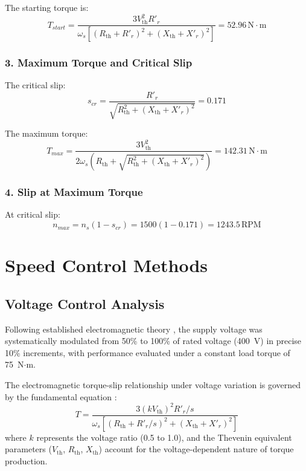 \documentclass[a4paper,12pt]{article}
\begin{document}
The starting torque is:
\begin{equation}
    T_{start} = \frac{3V_{\text{th}}^2R'_r}{\omega_s[(R_{\text{th}} + R'_r)^2 + (X_{\text{th}} + X'_r)^2]} = 52.96\,\text{N}\cdot\text{m}
\end{equation}

\subsubsection{3. Maximum Torque and Critical Slip}
The critical slip:
\begin{equation}
    s_{cr} = \frac{R'_r}{\sqrt{R_{\text{th}}^2 + (X_{\text{th}} + X'_r)^2}} = 0.171
\end{equation}

The maximum torque:
\begin{equation}
    T_{max} = \frac{3V_{\text{th}}^2}{2\omega_s(R_{\text{th}} + \sqrt{R_{\text{th}}^2 + (X_{\text{th}} + X'_r)^2})} = 142.31\,\text{N}\cdot\text{m}
\end{equation}

\subsubsection{4. Slip at Maximum Torque}
At critical slip:
\begin{equation}
    n_{max} = n_s(1-s_{cr}) = 1500(1-0.171) = 1243.5\,\text{RPM}
\end{equation}
 

\newpage

\section{Speed Control Methods}

\subsection{Voltage Control Analysis}
Following established electromagnetic theory \cite{fitzgerald2020}, the supply voltage was systematically modulated from 50\% to 100\% of rated voltage (400~V) in precise 10\% increments, with performance evaluated under a constant load torque of 75~N$\cdot$m.

The electromagnetic torque-slip relationship under voltage variation is governed by the fundamental equation \cite{krause2013}:
\begin{equation}
    T = \frac{3(kV_{\text{th}})^2R'_r/s}{\omega_s[(R_{\text{th}} + R'_r/s)^2 + (X_{\text{th}} + X'_r)^2]}
\end{equation}
where $k$ represents the voltage ratio (0.5 to 1.0), and the Thevenin equivalent parameters ($V_{\text{th}}$, $R_{\text{th}}$, $X_{\text{th}}$) account for the voltage-dependent nature of torque production.
\end{document}
